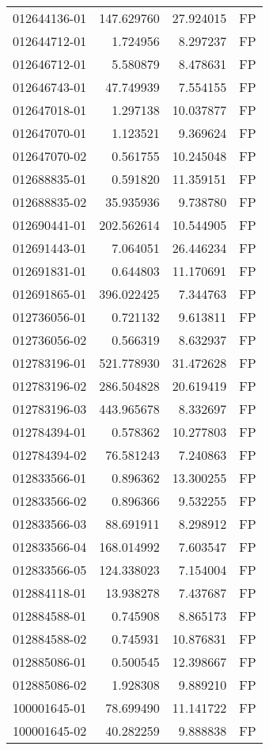 \begin{tabular}{lrrl}
012644136-01 &  147.629760 &      27.924015 &   FP \\
012644712-01 &    1.724956 &       8.297237 &   FP \\
012646712-01 &    5.580879 &       8.478631 &   FP \\
012646743-01 &   47.749939 &       7.554155 &   FP \\
012647018-01 &    1.297138 &      10.037877 &   FP \\
012647070-01 &    1.123521 &       9.369624 &   FP \\
012647070-02 &    0.561755 &      10.245048 &   FP \\
012688835-01 &    0.591820 &      11.359151 &   FP \\
012688835-02 &   35.935936 &       9.738780 &   FP \\
012690441-01 &  202.562614 &      10.544905 &   FP \\
012691443-01 &    7.064051 &      26.446234 &   FP \\
012691831-01 &    0.644803 &      11.170691 &   FP \\
012691865-01 &  396.022425 &       7.344763 &   FP \\
012736056-01 &    0.721132 &       9.613811 &   FP \\
012736056-02 &    0.566319 &       8.632937 &   FP \\
012783196-01 &  521.778930 &      31.472628 &   FP \\
012783196-02 &  286.504828 &      20.619419 &   FP \\
012783196-03 &  443.965678 &       8.332697 &   FP \\
012784394-01 &    0.578362 &      10.277803 &   FP \\
012784394-02 &   76.581243 &       7.240863 &   FP \\
012833566-01 &    0.896362 &      13.300255 &   FP \\
012833566-02 &    0.896366 &       9.532255 &   FP \\
012833566-03 &   88.691911 &       8.298912 &   FP \\
012833566-04 &  168.014992 &       7.603547 &   FP \\
012833566-05 &  124.338023 &       7.154004 &   FP \\
012884118-01 &   13.938278 &       7.437687 &   FP \\
012884588-01 &    0.745908 &       8.865173 &   FP \\
012884588-02 &    0.745931 &      10.876831 &   FP \\
012885086-01 &    0.500545 &      12.398667 &   FP \\
012885086-02 &    1.928308 &       9.889210 &   FP \\
100001645-01 &   78.699490 &      11.141722 &   FP \\
100001645-02 &   40.282259 &       9.888838 &   FP \\
\bottomrule
\end{tabular}
